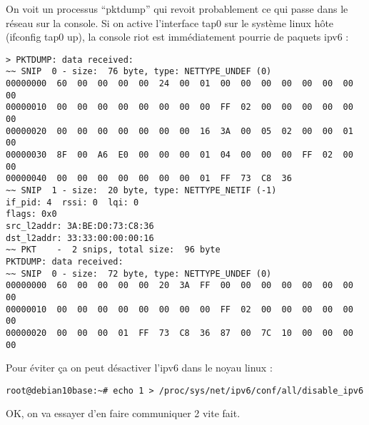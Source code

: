 On voit un processus \enquote{pktdump} qui revoit probablement ce qui passe dans le
réseau sur la console. Si on active l'interface tap0 sur le système linux hôte
(ifconfig tap0 up), la console riot est immédiatement pourrie de paquets ipv6 :
{\small
\begin{verbatim}
> PKTDUMP: data received:
~~ SNIP  0 - size:  76 byte, type: NETTYPE_UNDEF (0)
00000000  60  00  00  00  00  24  00  01  00  00  00  00  00  00  00  00
00000010  00  00  00  00  00  00  00  00  FF  02  00  00  00  00  00  00
00000020  00  00  00  00  00  00  00  16  3A  00  05  02  00  00  01  00
00000030  8F  00  A6  E0  00  00  00  01  04  00  00  00  FF  02  00  00
00000040  00  00  00  00  00  00  00  01  FF  73  C8  36
~~ SNIP  1 - size:  20 byte, type: NETTYPE_NETIF (-1)
if_pid: 4  rssi: 0  lqi: 0
flags: 0x0
src_l2addr: 3A:BE:D0:73:C8:36
dst_l2addr: 33:33:00:00:00:16
~~ PKT    -  2 snips, total size:  96 byte
PKTDUMP: data received:
~~ SNIP  0 - size:  72 byte, type: NETTYPE_UNDEF (0)
00000000  60  00  00  00  00  20  3A  FF  00  00  00  00  00  00  00  00
00000010  00  00  00  00  00  00  00  00  FF  02  00  00  00  00  00  00
00000020  00  00  00  01  FF  73  C8  36  87  00  7C  10  00  00  00  00
\end{verbatim}
}

Pour éviter ça on peut désactiver l'ipv6 dans le noyau linux :
\begin{verbatim}
root@debian10base:~# echo 1 > /proc/sys/net/ipv6/conf/all/disable_ipv6 
\end{verbatim}

OK, on va essayer d'en faire communiquer 2 vite fait.\\


